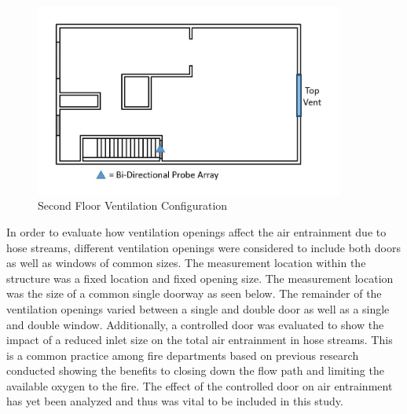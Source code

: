 \documentclass{article}
\begin{document}
\clearpage

\begin{figure}[!ht]
	\centering
	\includegraphics[width=4in]{Figures/Air_Entrainment/Measurement_Location_VentConfig_Top.jpg}
	\caption{Second Floor Ventilation Configuration}
	\label{fig:Second_Floor_Ventilation_Config}
\end{figure}

In order to evaluate how ventilation openings affect the air entrainment due to hose streams, different ventilation openings were considered to include both doors as well as windows of common sizes. The measurement location within the structure was a fixed location and fixed opening size. The measurement location was the size of a common single doorway as seen below. The remainder of the ventilation openings varied between a single and double door as well as a single and double window. Additionally, a controlled door was evaluated to show the impact of a reduced inlet size on the total air entrainment in hose streams. This is a common practice among fire departments based on previous research conducted showing the benefits to closing down the flow path and limiting the available oxygen to the fire. The effect of the controlled door on air entrainment has yet been analyzed and thus was vital to be included in this study.

\vspace*{\baselineskip}
\end{document}
